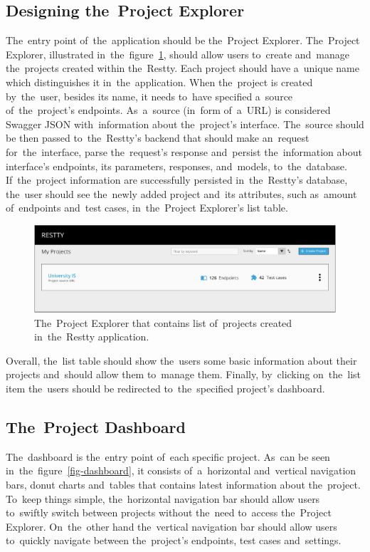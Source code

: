 \subsection{Designing the~Project Explorer}
The~entry point of~the~application should be the~Project Explorer. The~Project
Explorer, illustrated in~the~figure~\ref{fig-project-explorer}, should allow users to~create and~manage the~projects created within
the~Restty. Each project should have a~unique name which distinguishes it
in~the~application. When the~project is created by~the~user, besides its name,
it needs to~have specified a~source of~the~project's endpoints. As~a~source
(in~form of~a~URL) is considered Swagger JSON with~information about
the~project's interface. The~source should be then passed to~the~Restty's
backend that should make an~request for~the~interface, parse the~request's
response and~persist the~information about interface's endpoints, its parameters, responses, and~models,
to~the~database. If~the~project information are successfully persisted
in~the~Restty's database, the~user should see the~newly added project and~its
attributes, such as~amount of~endpoints and~test cases, in~the~Project
Explorer's list table.

\begin{figure}[!hbt]
	\centering
	\includegraphics[scale=0.55]{./designs/project-explorer.pdf}
	\caption{The~Project Explorer that contains list of~projects created
	in~the~Restty application.}
	\label{fig-project-explorer}
\end{figure}

Overall, the~list table should show the~users some basic information about their
projects and~should allow them to~manage them. Finally, by~clicking on~the~list
item the~users should be redirected to~the~specified project's dashboard.


\subsection{The~Project Dashboard}
The~dashboard is the~entry point of~each specific project. As~can be seen in~the~figure~\ref{fig-dashboard}, it consists
of~a~horizontal and~vertical navigation bars, donut charts and~tables that
contains latest information about the~project. To~keep things simple,
the~horizontal navigation bar should allow users to~swiftly switch between
projects without the~need to~access the~Project Explorer. On~the~other hand
the~vertical navigation bar should allow users to~quickly navigate between
the~project's endpoints, test cases and~settings.

